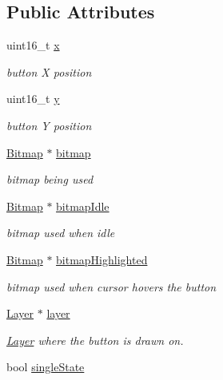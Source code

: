 \subsection*{Public Attributes}
\begin{DoxyCompactItemize}
\item 
uint16\+\_\+t \mbox{\hyperlink{group__sprite_ga7e12fd65ad1fdbd19721a3c109efd3bf}{x}}
\begin{DoxyCompactList}\small\item\em button X position \end{DoxyCompactList}\item 
uint16\+\_\+t \mbox{\hyperlink{group__sprite_ga0e057db96fd0683cd5236af8921671a6}{y}}
\begin{DoxyCompactList}\small\item\em button Y position \end{DoxyCompactList}\item 
\mbox{\hyperlink{struct_bitmap}{Bitmap}} $\ast$ \mbox{\hyperlink{group__sprite_gaa57f73b6227397e025dc60e8c460fcb3}{bitmap}}
\begin{DoxyCompactList}\small\item\em bitmap being used \end{DoxyCompactList}\item 
\mbox{\hyperlink{struct_bitmap}{Bitmap}} $\ast$ \mbox{\hyperlink{group__sprite_ga509d33b7b3b9dd4f7c10c3c05c0a6ca0}{bitmap\+Idle}}
\begin{DoxyCompactList}\small\item\em bitmap used when idle \end{DoxyCompactList}\item 
\mbox{\hyperlink{struct_bitmap}{Bitmap}} $\ast$ \mbox{\hyperlink{group__sprite_gaf915bef19af626f44f41a7513feaef7e}{bitmap\+Highlighted}}
\begin{DoxyCompactList}\small\item\em bitmap used when cursor hovers the button \end{DoxyCompactList}\item 
\mbox{\hyperlink{struct_layer}{Layer}} $\ast$ \mbox{\hyperlink{group__sprite_ga76e365a5ffde4b0759c8bbd1cc7b932c}{layer}}
\begin{DoxyCompactList}\small\item\em \mbox{\hyperlink{struct_layer}{Layer}} where the button is drawn on. \end{DoxyCompactList}\item 
bool \mbox{\hyperlink{group__sprite_ga582e96a8182496689178c543a86d3401}{single\+State}}

\end{DoxyCompactItemize}
